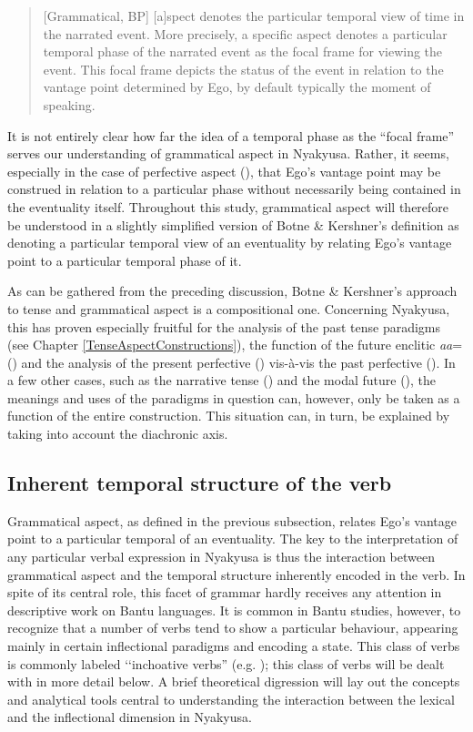 \begin{quote}
[Grammatical, BP] [a]spect denotes the particular temporal view of time in the narrated event. More precisely, a speciﬁc aspect denotes a particular temporal phase of the narrated event as the focal frame for viewing the event. This focal frame depicts the status of the event in relation to the vantage point determined by Ego, by default typically the moment of speaking. \citep[171]{BotneRKershnerT2008}
\end{quote}

It is not entirely clear how far the idea of a temporal phase as the ``focal frame'' serves our understanding of grammatical aspect in Nyakyusa. Rather, it seems, especially in the case of perfective aspect (), that Ego's vantage point may be construed in relation to a particular phase without necessarily being contained in the eventuality itself. Throughout this study, grammatical aspect will therefore be understood in a slightly simplified version of Botne \& Kershner's definition as denoting a particular temporal view of an eventuality by relating Ego's vantage point to a particular temporal phase of it.

As can be gathered from the preceding discussion, Botne \& Kershner's approach to tense and grammatical aspect is a compositional one. Concerning Nyakyusa, this has proven especially fruitful for the analysis of the past tense paradigms (see Chapter \ref{TenseAspectConstructions}), the function of the future enclitic \textit{aa}= () and the analysis of the present perfective () vis-à-vis the past perfective (). In a few other cases, such as the narrative tense () and the modal future (), the meanings and uses of the paradigms in question can, however, only be taken as a function of the entire construction. This situation can, in turn, be explained by taking into account the diachronic axis.
\subsection{Inherent temporal structure of the verb}\label{InherentTemporalStructure}
Grammatical aspect, as defined in the previous subsection, relates Ego's vantage point to a particular temporal  of an eventuality. The key to the interpretation of any particular verbal expression in Nyakyusa is thus the interaction between grammatical aspect and the temporal structure inherently encoded in the verb. In spite of its central role, this facet of grammar hardly receives any attention in descriptive work on Bantu languages. It is common in Bantu studies, however, to recognize that a number of verbs tend to show a particular behaviour, appearing mainly in certain inflectional paradigms and encoding a state. This class of verbs is commonly labeled \lq\lq inchoative verbs'' (e.g. \citealt[55–60]{ColeD1955}); this class of verbs will be dealt with in more detail below. A brief theoretical digression will lay out the concepts and analytical tools central to understanding the interaction between the lexical and the inflectional dimension in Nyakyusa.
